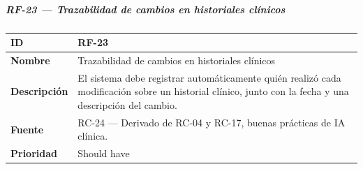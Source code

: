 \documentclass[
]{article}
\newcounter{none} %
\begin{document}
\subparagraph{RF-23 --- Trazabilidad de cambios en historiales
clínicos}\label{rf-23-trazabilidad-de-cambios-en-historiales-cluxednicos}

{\def\LTcaptype{none} %
\begin{longtable}[]{@{}
  >{\raggedright\arraybackslash}p{}
  >{\raggedright\arraybackslash}p{}@{}}
\toprule\noalign{}
\begin{minipage}[b]{\linewidth}\raggedright
\textbf{ID}
\end{minipage} & \begin{minipage}[b]{\linewidth}\raggedright
RF-23
\end{minipage} \\
\midrule\noalign{}
\endhead
\bottomrule\noalign{}
\endlastfoot
\textbf{Nombre} & \begin{minipage}[t]{\linewidth}\raggedright
Trazabilidad de cambios en historiales clínicos
\end{minipage} \\
\textbf{Descripción} & \begin{minipage}[t]{\linewidth}\raggedright
El sistema debe registrar automáticamente quién realizó cada
modificación sobre un historial clínico, junto con la fecha y una
descripción del cambio.
\end{minipage} \\
\textbf{Fuente} & \begin{minipage}[t]{\linewidth}\raggedright
RC-24 --- Derivado de RC-04 y RC-17, buenas prácticas de IA clínica.
\end{minipage} \\
\textbf{Prioridad} & \begin{minipage}[t]{\linewidth}\raggedright
Should have
\end{minipage} \\
\end{longtable}
}
\end{document}
